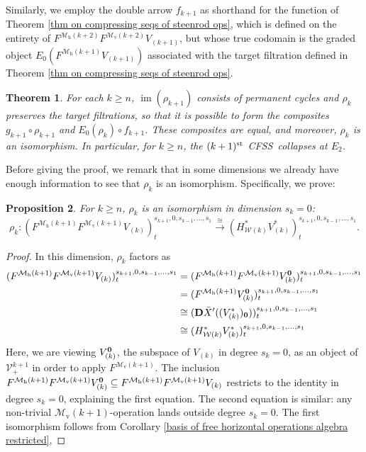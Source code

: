\documentclass[11pt]{amsart} \renewcommand{\baselinestretch}{1.2}
\theoremstyle{plain}
\newtheorem{thm}{Theorem}[section] %
\newtheorem{prop}[thm]{Proposition}
\numberwithin{equation}{section} %
\theoremstyle{plain}
\newtheorem{thm}{Theorem}[chapter] %
\newtheorem{prop}[thm]{Proposition}
\numberwithin{equation}{chapter} %
\DeclareMathOperator{\im}{im}
\renewcommand{\to}{\longrightarrow}
\newcommand{\calV}{\mathcal{V}}
\newcommand{\calw}{\mathcal{W}}
\newcommand{\calMv}{\mathcal{M}\dver}
\newcommand{\calMh}{\mathcal{M}\dhor}
\newcommand{\vect}[2]{\calV^{#1}_{#2}}
\newcommand{\UEAX}{\bar{X}'}%
\newcommand{\dver}{_\mathrm{v}}
\newcommand{\dhor}{_\mathrm{h}}
\newcommand{\dual}{\mathbf{D}}
\newcommand{\CFSS}{CFSS}
\begin{document}
\begin{Calculations of HWn}
Similarly, we employ the double arrow $f_{k+1}$ as shorthand for the function of Theorem \ref{thm on compressing seqs of steenrod ops}, which is defined on the entirety of $F^{\calMh(k+2)}F^{\calMv(k+2)}V_{(k+1)}$, but whose true codomain is the graded object $E_0(F^{\calMh(k+1)}V_{(k+1)})$ associated with the target filtration defined in Theorem \ref{thm on compressing seqs of steenrod ops}.
\begin{thm}
\label{thm on collapsing of most sseqs}
For each $k\geq n$, $\im(\rho_{k+1})$ consists of permanent cycles and $\rho_k$ preserves the target filtrations, so that it is possible to form the composites $g_{k+1}\circ \rho_{k+1}$ and $E_0(\rho_{k})\circ f_{k+1}$. These composites are equal, and moreover, $\rho_k$ is an isomorphism. In particular, for $k\geq n$, the  $(k+1)^{\textup{st}}$ \CFSS\ collapses at $E_2$.
\end{thm}
Before giving the proof, we remark that in some dimensions we already have enough information to see that $\rho_k$ is an isomorphism. Specifically, we prove:
\begin{prop}
\label{isomorphism rho k in some dims}
For $k\geq n$, $\rho_k$ is an isomorphism in dimension $s_k=0$:
\[\rho_k:(F^{\calMh(k+1)}F^{\calMv(k+1)}V_{(k)})^{s_{k+1},0,s_{k-1},\ldots,s_1}_{t} \overset{\cong}{\to}(H^*_{\calw(k)}V^*_{(k)})^{s_{k+1},0,s_{k-1},\ldots,s_1}_{t}.\]
\end{prop}
\begin{proof}
In this dimension, $\rho_k$ factors as
\begin{alignat*}{2}
(F^{\calMh(k+1)}F^{\calMv(k+1)}V_{(k)})^{s_{k+1},0,s_{k-1},\ldots,s_1}_{t}
&=
(F^{\calMh(k+1)} F^{\calMv(k+1)}V_{(k)}^{\textbf{\textup{0}}})^{s_{k+1},0,s_{k-1},\ldots,s_1}_{t}\\
&=(F^{\calMh(k+1)}V_{(k)}^{\textbf{\textup{0}}})^{s_{k+1},0,s_{k-1},\ldots,s_1}_{t}\\
&\cong (\dual\UEAX((V^*_{(k)})_{\textbf{\textup{0}}}))^{s_{k+1},0,s_{k-1},\ldots,s_1}_{t}\\
&\cong (H^*_{\calw(k)}V^*_{(k)})^{s_{k+1},0,s_{k-1},\ldots,s_1}_{t}
\end{alignat*}
Here, we are viewing $V_{(k)}^{\textbf{\textup{0}}}$, the subspace of $V_{(k)}$ in degree $s_k=0$, as an object of $\vect{k+1}{+}$ in order to apply $F^{\calMv(k+1)}$. The inclusion $F^{\calMh(k+1)}F^{\calMv(k+1)}V_{(k)}^{\textbf{\textup{0}}}\subseteq F^{\calMh(k+1)}F^{\calMv(k+1)}V_{(k)}$ restricts to the identity in degree $s_k=0$, explaining the first equation. The second equation is similar: any non-trivial $\calMv(k+1)$-operation lands outside degree $s_k=0$. The first isomorphism follows from Corollary \ref{basis of free horizontal operations algebra restricted}, %

\end{proof}
\end{Calculations of HWn}
\end{document}

